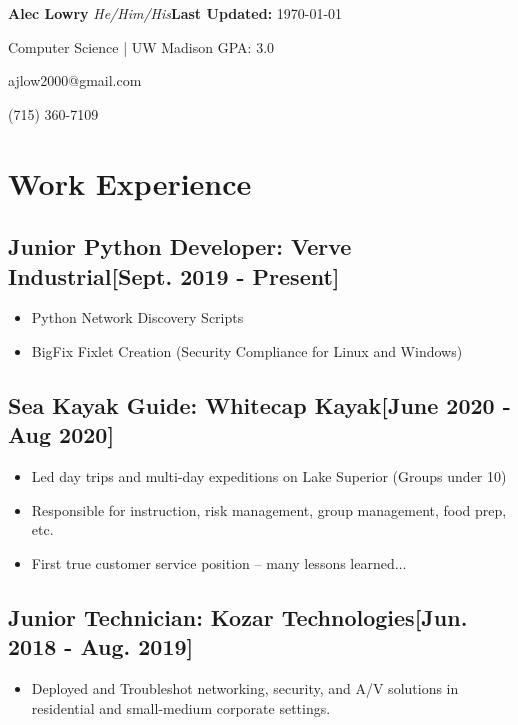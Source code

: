\documentclass{article}
\begin{document}
\textbf{Alec Lowry} \emph{He/Him/His}\hfill{\textbf{Last Updated:} \today}

Computer Science | UW Madison GPA: 3.0

ajlow2000@gmail.com

(715) 360-7109

\section{ Work Experience}

    \subsection{\textbf{Junior Python Developer}: Verve Industrial\hfill[Sept. 2019 - Present]}
        \begin{itemize}
            \item Python Network Discovery Scripts
            \item BigFix Fixlet Creation (Security Compliance for Linux and Windows)
        \end{itemize}

    \subsection{\textbf{Sea Kayak Guide}: Whitecap Kayak\hfill[June 2020 - Aug 2020]}
        \begin{itemize}
            \item Led day trips and multi-day expeditions on Lake Superior (Groups under 10)
            \item Responsible for instruction, risk management, group management, food prep, etc.
            \item First true customer service position -- many lessons learned...
        \end{itemize}

    \subsection{\textbf{Junior Technician}: Kozar Technologies\hfill[Jun. 2018 - Aug. 2019]}
        \begin{itemize}
            \item Deployed and Troubleshot networking, security, and A/V solutions in residential and small-medium corporate settings.
        \end{itemize}
\end{document}
